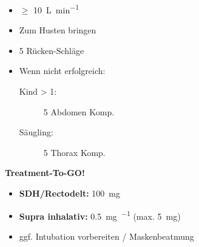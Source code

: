 \documentclass{article}
\begin{document}
\sopHeadSkip%

\vfill

\begin{sopSection}[frametitle={Fremdkörper-Aspiration}]
  \begin{minipage}[t]{0.4\textwidth}
    \begin{itemize}
      \item {\Ox} $\geq$ \SI{10}{\liter\per\minute}
      \item Zum Husten bringen
      \item 5 Rücken-Schläge
    \end{itemize}
  \end{minipage}
  \hfill
  \begin{minipage}[t]{0.59\textwidth}
    \begin{itemize}
      \item Wenn nicht erfolgreich:
        \begin{description}
          \item[Kind > 1:] 5 Abdomen Komp.
          \item[Säugling:] 5 Thorax Komp.
        \end{description}
    \end{itemize}
  \end{minipage}
\end{sopSection}

\vfill

\begin{sopSection}[frametitle={Insektenstich}]
  \begin{center}
    \textbf{Treatment-To-GO!}
  \end{center}
  \begin{itemize}
    \item \textbf{SDH/Rectodelt:} \SI{100}{\milli\gram}
    \item \textbf{Supra inhalativ:} \SI{0.5}{\milli\gram\per\kgKG}
      (max. \SI{5}{\milli\gram})
    \item ggf. Intubation vorbereiten / Maskenbeatmung
  \end{itemize}
\end{sopSection}

\vfill
\pagebreak
\vfill
\end{document}
